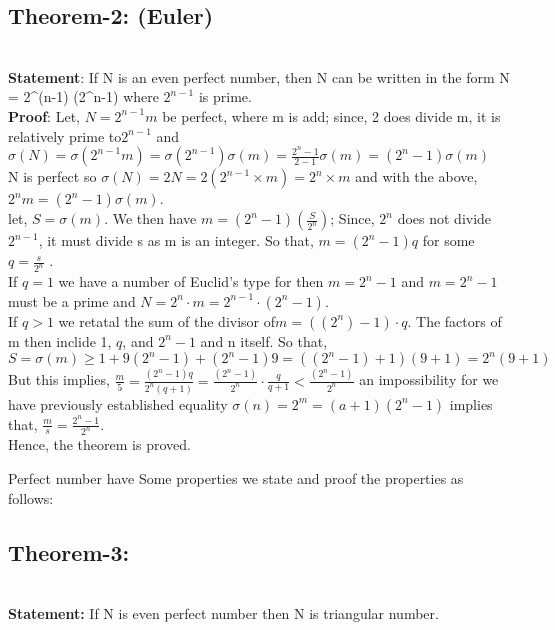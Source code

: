 \documentclass[12pt,,a4paper]{book}
\begin{document}
\subsection*{Theorem-2: (Euler)} \\
\textbf{Statement}: If N is an even perfect number, then N
can be written in the form N = 2^{(n-1)} (2^n-1) where  \(2^{n-1}\) is prime. \\ \vspace{10pt}
\textbf{Proof}: Let, \(N = 2^{n-1}m\) be perfect, where m is add; since, 2  does divide m, it is relatively prime to\(2^{n-1}\) and  \(\sigma(N) = \sigma(2^{n-1}m) = \sigma(2^{n-1})\sigma(m) = \frac{{2^n-1}}{{2-1}} \sigma(m) = (2^n-1) \sigma(m)\)  \\
 N is perfect so \(\sigma(N) = 2N = 2(2^{n-1} \times m) = 2^n \times m\) and with the above, 
\(2^n m = (2^n-1) \sigma (m)\). \\
let, \(S=\sigma(m)\). We then have \(m=(2^n-1) \left(\frac{S}{2^n}\right)\); Since, \(2^n\) does not divide \(2^{n-1}\), it must divide s as m is an integer. So that, \(m = (2^n-1)q\) for some \(q = \frac{s}{2^n}\) . \\
If \(q = 1\) we have a number of Euclid's type for then \(m = 2^n - 1\) and \(m = 2^n - 1\) must be a prime and \(N = 2^n \cdot m = 2^{n-1} \cdot (2^n-1)\). \\
 If \(q > 1\) we retatal the sum of the divisor of\(m = ((2^n) - 1) \cdot q\). The factors of m then inclide 1, \(q\), and \(2^n - 1\) and n itself. So that, \\
 \(S = \sigma(m) \geq 1 + 9(2^n-1)+(2^n-1)9 =((2^n-1) +1)(9+1) = 2^n(9+1)\)\\
 But this implies, 
\(\frac{m}{5} = \frac{(2^n-1)q}{2^n(q+1)} = \frac{(2^n -1)}{2^n} \cdot \frac{q}{q+1} < \frac{(2^n -1)}{2^n}\) an impossibility  for we have  previously established equality \(\sigma(n) = 2^m = (a+1)(2^n-1)\) implies that, \(\frac{m}{s} = \frac{2^n-1}{2^n}\). \\ Hence, the theorem is proved. \\ 
\vspace{10pt}

Perfect number have Some properties we state and proof the properties as follows: \\
\vspace{10pt}
\subsection*{Theorem-3:}\\
 \textbf{Statement:} If N is even perfect number then N is triangular number.
 
\end{document}
